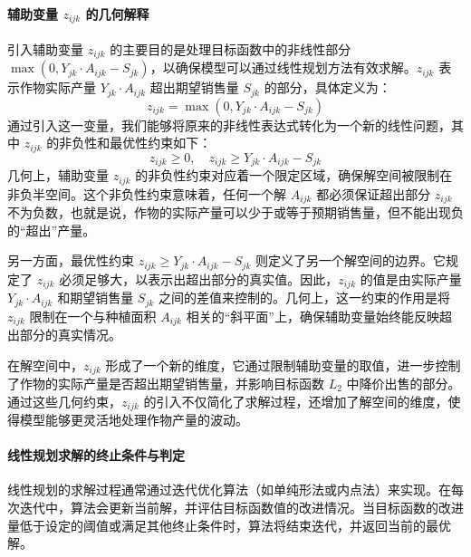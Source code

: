 \documentclass[12pt,a4paper]{nmmcm}
\begin{document}
\paragraph{辅助变量 $z_{ijk}$ 的几何解释}

引入辅助变量 $z_{ijk}$ 的主要目的是处理目标函数中的非线性部分 $\max(0, Y_{jk} \cdot A_{ijk} - S_{jk})$，以确保模型可以通过线性规划方法有效求解。$z_{ijk}$ 表示作物实际产量 $Y_{jk} \cdot A_{ijk}$ 超出期望销售量 $S_{jk}$ 的部分，具体定义为：
\[
z_{ijk} = \max(0, Y_{jk} \cdot A_{ijk} - S_{jk})
\]
通过引入这一变量，我们能够将原来的非线性表达式转化为一个新的线性问题，其中 $z_{ijk}$ 的非负性和最优性约束如下：
\[
z_{ijk} \geq 0, \quad z_{ijk} \geq Y_{jk} \cdot A_{ijk} - S_{jk}
\]
几何上，辅助变量 $z_{ijk}$ 的非负性约束对应着一个限定区域，确保解空间被限制在非负半空间。这个非负性约束意味着，任何一个解 $A_{ijk}$ 都必须保证超出部分 $z_{ijk}$ 不为负数，也就是说，作物的实际产量可以少于或等于预期销售量，但不能出现负的“超出”产量。

另一方面，最优性约束 $z_{ijk} \geq Y_{jk} \cdot A_{ijk} - S_{jk}$ 则定义了另一个解空间的边界。它规定了 $z_{ijk}$ 必须足够大，以表示出超出部分的真实值。因此，$z_{ijk}$ 的值是由实际产量 $Y_{jk} \cdot A_{ijk}$ 和期望销售量 $S_{jk}$ 之间的差值来控制的。几何上，这一约束的作用是将 $z_{ijk}$ 限制在一个与种植面积 $A_{ijk}$ 相关的“斜平面”上，确保辅助变量始终能反映超出部分的真实情况。

在解空间中，$z_{ijk}$ 形成了一个新的维度，它通过限制辅助变量的取值，进一步控制了作物的实际产量是否超出期望销售量，并影响目标函数 $L_2$ 中降价出售的部分。通过这些几何约束，$z_{ijk}$ 的引入不仅简化了求解过程，还增加了解空间的维度，使得模型能够更灵活地处理作物产量的波动。

\paragraph{线性规划求解的终止条件与判定}

线性规划的求解过程通常通过迭代优化算法（如单纯形法或内点法）来实现。在每次迭代中，算法会更新当前解，并评估目标函数值的改进情况。当目标函数的改进量低于设定的阈值或满足其他终止条件时，算法将结束迭代，并返回当前的最优解。
\end{document}
